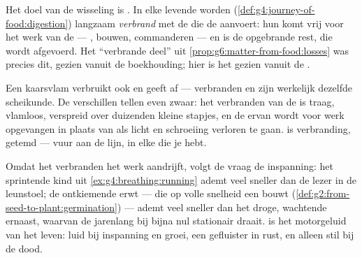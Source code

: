 \begin{proposition}\label{prop:g7:what-is-respiration:power}
Het doel van de wisseling is \emph{}. In elke levende  worden
 (\cref{def:g4:journey-of-food:digestion}) langzaam
\emph{verbrand} met de  die de  aanvoert: hun 
komt vrij voor het werk van de  --- , bouwen, commanderen
--- en  is de opgebrande rest, die wordt afgevoerd. Het
``verbrande deel'' uit \cref{prop:g6:matter-from-food:losses} was precies
dit, gezien vanuit de boekhouding; hier is het gezien vanuit de .
\end{proposition}
\admitted

\begin{example}\label{ex:g7:what-is-respiration:fire}
Een kaarsvlam verbruikt ook  en geeft  af ---
verbranden en  zijn werkelijk dezelfde  scheikunde. De
verschillen tellen even zwaar: het verbranden van de  is traag,
vlamloos, verspreid over duizenden kleine stapjes, en de  ervan
wordt voor werk opgevangen in plaats van als licht en schroeiing verloren
te gaan.  is verbranding, getemd --- vuur aan de lijn, in elke
 die je hebt.
\end{example}

\begin{example}\label{ex:g7:what-is-respiration:demand}
Omdat het verbranden het werk aandrijft, volgt de vraag de inspanning:
het sprintende kind uit \cref{ex:g4:breathing:running} ademt veel sneller
dan de lezer in de leunstoel; de ontkiemende erwt --- die op volle
snelheid een  bouwt
(\cref{def:g2:from-seed-to-plant:germination}) --- ademt veel sneller dan
het droge, wachtende  ernaast, waarvan de  jarenlang bij
bijna nul stationair draait.  is het motorgeluid van het leven:
luid bij inspanning en groei, een gefluister in rust, en alleen stil bij
de dood.
\end{example}

